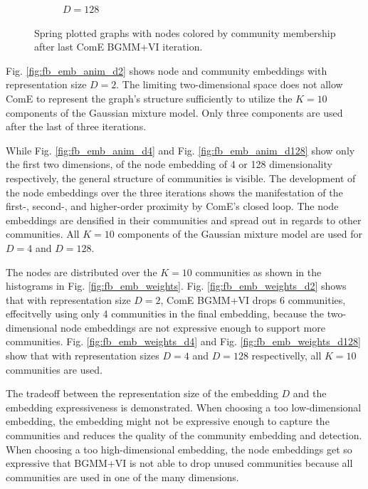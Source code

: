 \documentclass[conference]{IEEEtran}
\begin{document}
\begin{figure}[htbp]
\begin{subfigure}{.33\textwidth}
        \caption{$D=128$}
    \end{subfigure}%
    \caption{Spring plotted graphs with nodes colored by community membership after last ComE BGMM+VI iteration.}
    \label{fig:fb_graphs}
\end{figure}

Fig. \ref{fig:fb_emb_anim_d2} shows node and community embeddings with representation size $D=2$. The limiting two-dimensional space does not allow ComE to represent the \citet{social_circles_fb} graph's structure sufficiently to utilize the $K=10$ components of the Gaussian mixture model. Only three components are used after the last of three iterations.

While Fig. \ref{fig:fb_emb_anim_d4} and Fig. \ref{fig:fb_emb_anim_d128} show only the first two dimensions, of the node embedding of 4 or 128 dimensionality respectively, the general structure of communities is visible. The development of the node embeddings over the three iterations shows the manifestation of the first-, second-, and higher-order proximity by ComE's closed loop. The node embeddings are densified in their communities and spread out in regards to other communities. All $K=10$ components of the Gaussian mixture model are used for $D=4$ and $D=128$.

The nodes are distributed over the $K=10$ communities as shown in the histograms in Fig. \ref{fig:fb_emb_weights}. Fig. \ref{fig:fb_emb_weights_d2} shows that with representation size $D=2$, ComE BGMM+VI drops 6 communities, effecitvelly using only 4 communities in the final embedding, because the two-dimensional node embeddings are not expressive enough to support more communities. Fig. \ref{fig:fb_emb_weights_d4} and Fig. \ref{fig:fb_emb_weights_d128} show that with representation sizes $D=4$ and $D=128$ respectivelly, all $K=10$ communities are used.

The tradeoff between the representation size of the embedding $D$ and the embedding expressiveness is demonstrated. When choosing a too low-dimensional embedding, the embedding might not be expressive enough to capture the communities and reduces the quality of the community embedding and detection. When choosing a too high-dimensional embedding, the node embeddings get so expressive that BGMM+VI is not able to drop unused communities because all communities are used in one of the many dimensions.
\end{document}
